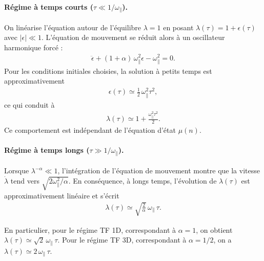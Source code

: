 \paragraph{Régime à temps courts (\(\tau \ll 1/\omega_\parallel\)).}  
On linéarise l'équation autour de l'équilibre \(\lambda=1\) en posant \(\lambda(\tau)=1+\epsilon(\tau)\) avec \(|\epsilon|\ll 1\). L'équation de mouvement se réduit alors à un oscillateur harmonique forcé :
\begin{eqnarray}
\ddot \epsilon + (1+\alpha)\,\omega_\parallel^2 \epsilon - \omega_\parallel^2 = 0.
\end{eqnarray}
Pour les conditions initiales choisies, la solution à petits temps est approximativement
\begin{eqnarray}
\epsilon(\tau) \simeq \frac{1}{2}\,\omega_\parallel^2 \tau^2,
\end{eqnarray}
ce qui conduit à
\begin{eqnarray}
\lambda(\tau) \simeq 1 + \frac{\omega_\parallel^2 \tau^2}{2}.
\end{eqnarray}
Ce comportement est indépendant de l'équation d'état \(\mu(n)\).%

\paragraph{Régime à temps longs (\(\tau \gg 1/\omega_\parallel\)).}  
Lorsque \(\lambda^{-\alpha} \ll 1\), l'intégration de l'équation de mouvement montre que la vitesse \(\dot\lambda\) tend vers \(\sqrt{2\omega_\parallel^2/\alpha}\).  
En conséquence, à longs temps, l'évolution de \(\lambda(\tau)\) est approximativement linéaire et s'écrit
\begin{eqnarray}
\lambda(\tau) \simeq \sqrt{\frac{2}{\alpha}}\,\omega_\parallel \, \tau.
\end{eqnarray}


En particulier, pour le régime \gls{TF} 1D, correspondant à \(\alpha = 1\), on obtient 
\(\lambda(\tau) \simeq \sqrt{2}\, \omega_\parallel \, \tau\).  
Pour le régime \gls{TF} 3D, correspondant à \(\alpha = 1/2\), on a 
\(\lambda(\tau) \simeq 2\, \omega_\parallel \, \tau\).

